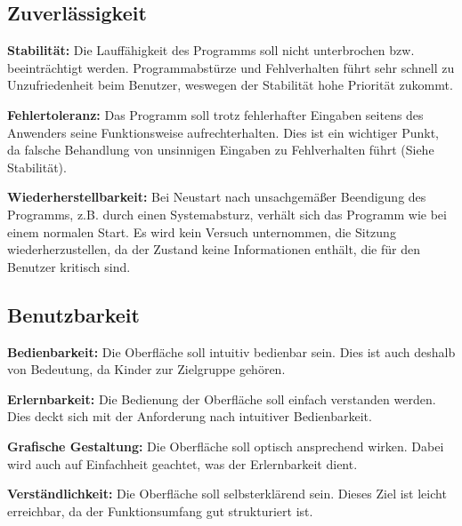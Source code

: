 \documentclass[10pt]{scrreprt}
\newenvironment{indents}{%
  \parskip6pt \parindent5mm \raggedright%
  \def\item{\hangindent=5mm \hangafter1}}{%
  \par\ignorespaces}
\begin{document}
\subsection*{Zuverlässigkeit}
\begin{indents}
\item \textbf{Stabilität:} Die Lauffähigkeit des Programms soll nicht unterbrochen bzw. beeinträchtigt werden. Programmabstürze und Fehlverhalten führt sehr schnell zu Unzufriedenheit beim Benutzer, weswegen der Stabilität hohe Priorität zukommt.

\item \textbf{Fehlertoleranz:} Das Programm soll trotz fehlerhafter Eingaben seitens des Anwenders seine Funktionsweise aufrechterhalten. Dies ist ein wichtiger Punkt, da falsche Behandlung von unsinnigen Eingaben zu Fehlverhalten führt (Siehe Stabilität).

\item \textbf{Wiederherstellbarkeit:} Bei Neustart nach unsachgemäßer Beendigung des Programms, z.B. durch einen Systemabsturz, verhält sich das Programm wie bei einem normalen Start. Es wird kein Versuch unternommen, die Sitzung wiederherzustellen, da der Zustand keine Informationen enthält, die für den Benutzer kritisch sind.
\end{indents}


\subsection*{Benutzbarkeit}
\begin{indents}
\item \textbf{Bedienbarkeit:} Die Oberfläche soll intuitiv bedienbar sein. Dies ist auch deshalb von Bedeutung, da Kinder zur Zielgruppe gehören.

\item \textbf{Erlernbarkeit:} Die Bedienung der Oberfläche soll einfach verstanden werden. Dies deckt sich mit der Anforderung nach intuitiver Bedienbarkeit.

\item \textbf{Grafische Gestaltung:} Die Oberfläche soll optisch ansprechend wirken. Dabei wird auch auf Einfachheit geachtet, was der Erlernbarkeit dient.

\item \textbf{Verständlichkeit:} Die Oberfläche soll selbsterklärend sein. Dieses Ziel ist leicht erreichbar, da der Funktionsumfang gut strukturiert ist.
\end{indents}
\end{document}
